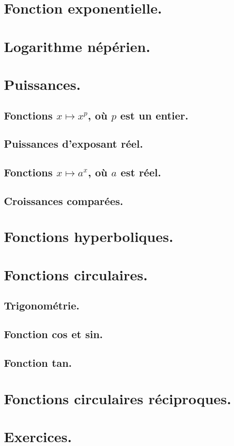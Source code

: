 \documentclass[11pt]{article}
\begin{document}


\thispagestyle{fancy}

\section{Fonction exponentielle.}

\section{Logarithme népérien.}

\section{Puissances.}

\subsection{Fonctions \texorpdfstring{$x\mapsto x^p$}{Lg}, où \texorpdfstring{$p$}{Lg} est un entier.}

\subsection{Puissances d'exposant réel.}

\subsection{Fonctions \texorpdfstring{$x\mapsto a^x$}{Lg}, où \texorpdfstring{$a$}{Lg} est réel.}

\subsection{Croissances comparées.}

\section{Fonctions hyperboliques.}

\section{Fonctions circulaires.}

\subsection{Trigonométrie.}

\subsection{Fonction cos et sin.}

\subsection{Fonction tan.}

\section{Fonctions circulaires réciproques.}

\section{Exercices.}
\end{document}
